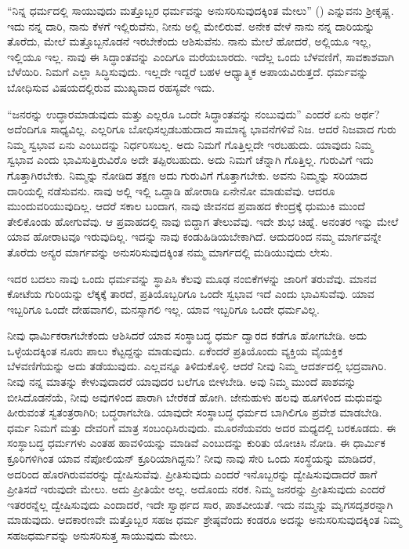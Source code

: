 “ನಿನ್ನ ಧರ್ಮದಲ್ಲಿ ಸಾಯುವುದು ಮತ್ತೊಬ್ಬರ ಧರ್ಮವನ್ನು ಅನುಸರಿಸುವುದಕ್ಕಿಂತ ಮೇಲು” () ಎನ್ನುವನು ಶ‍್ರೀಕೃಷ್ಣ. ಇದು ನನ್ನ ದಾರಿ, ನಾನು ಕೆಳಗೆ ಇಲ್ಲಿರುವೆನು, ನೀನು ಅಲ್ಲಿ ಮೇಲಿರುವೆ. ಅನೇಕ ವೇಳೆ ನಾನು ನನ್ನ ದಾರಿಯನ್ನು ತೊರೆದು, ಮೇಲೆ ಮತ್ತೊಬ್ಬನೊಡನೆ ಇರಬೇಕೆಂದು ಆಶಿಸುವೆನು. ನಾನು ಮೇಲೆ ಹೋದರೆ, ಅಲ್ಲಿಯೂ ಇಲ್ಲ, ಇಲ್ಲಿಯೂ ಇಲ್ಲ. ನಾವು ಈ ಸಿದ್ಧಾಂತವನ್ನು ಎಂದಿಗೂ ಮರೆಯಬಾರದು. ಇದೆಲ್ಲ ಒಂದು ಬೆಳವಣಿಗೆ, ಸಾವಕಾಶವಾಗಿ ಬೆಳೆಯಿರಿ. ನಿಮಗೆ ಎಲ್ಲಾ ಸಿದ್ಧಿಸುವುದು. ಇಲ್ಲದೇ ಇದ್ದರೆ ಬಹಳ ಆಧ್ಯಾತ್ಮಿಕ ಅಪಾಯವಿರುತ್ತದೆ. ಧರ್ಮವನ್ನು ಬೋಧಿಸುವ ವಿಷಯದಲ್ಲಿರುವ ಮುಖ್ಯವಾದ ರಹಸ್ಯವೇ ಇದು.

“ಜನರನ್ನು ಉದ್ಧಾರಮಾಡುವುದು ಮತ್ತು ಎಲ್ಲರೂ ಒಂದೇ ಸಿದ್ಧಾಂತವನ್ನು ನಂಬುವುದು” ಎಂದರೆ ಏನು ಅರ್ಥ? ಅದೆಂದಿಗೂ ಸಾಧ್ಯವಿಲ್ಲ. ಎಲ್ಲರಿಗೂ ಬೋಧಿಸಲ್ಪಡಬಹುದಾದ ಸಾಮಾನ್ಯ ಭಾವನೆಗಳಿವೆ ನಿಜ. ಆದರೆ ನಿಜವಾದ ಗುರು ನಿಮ್ಮ ಸ್ವಭಾವ ಏನು ಎಂಬುದನ್ನು ನಿರ್ಧರಿಸಬಲ್ಲ. ಅದು ನಿಮಗೆ ಗೊತ್ತಿಲ್ಲದೇ ಇರಬಹುದು. ಯಾವುದು ನಿಮ್ಮ ಸ್ವಭಾವ ಎಂದು ಭಾವಿಸುತ್ತಿರುವಿರೊ ಅದೇ ತಪ್ಪಿರಬಹುದು. ಅದು ನಿಮಗೆ ಚೆನ್ನಾಗಿ ಗೊತ್ತಿಲ್ಲ. ಗುರುವಿಗೆ ಇದು ಗೊತ್ತಾಗಿರಬೇಕು. ನಿಮ್ಮನ್ನು ನೋಡಿದ ತಕ್ಷಣ ಅದು ಗುರುವಿಗೆ ಗೊತ್ತಾಗಬೇಕು. ಅವನು ನಿಮ್ಮನ್ನು ಸರಿಯಾದ ದಾರಿಯಲ್ಲಿ ನಡೆಸುವನು. ನಾವು ಅಲ್ಲಿ ಇಲ್ಲಿ ಒದ್ದಾಡಿ ಹೋರಾಡಿ ಏನೇನೋ ಮಾಡುವೆವು. ಆದರೂ ಮುಂದುವರಿಯುವುದಿಲ್ಲ. ಆದರೆ ಸಕಾಲ ಬಂದಾಗ, ನಾವು ಜೀವನದ ಪ್ರವಾಹದ ಕೇಂದ್ರಕ್ಕೆ ಧುಮುಕಿ ಮುಂದೆ ತೇಲಿಕೊಂಡು ಹೋಗುವೆವು. ಆ ಪ್ರವಾಹದಲ್ಲಿ ನಾವು ಬಿದ್ದಾಗ ತೇಲುವೆವು. ಇದೇ ಶುಭ ಚಿಹ್ನೆ. ಅನಂತರ ಇನ್ನು ಮೇಲೆ ಯಾವ ಹೋರಾಟವೂ ಇರುವುದಿಲ್ಲ. ಇದನ್ನು ನಾವು ಕಂಡುಹಿಡಿಯಬೇಕಾಗಿದೆ. ಆದುದರಿಂದ ನಮ್ಮ ಮಾರ್ಗವನ್ನೇ ತೊರೆದು ಅನ್ಯರ ಮಾರ್ಗವನ್ನು ಅನುಸರಿಸುವುದಕ್ಕಿಂತ ನಮ್ಮ ಮಾರ್ಗದಲ್ಲಿ ಮಡಿಯುವುದು ಲೇಸು.

ಇದರ ಬದಲು ನಾವು ಒಂದು ಧರ್ಮವನ್ನು ಸ್ಥಾಪಿಸಿ ಕೆಲವು ಮೂಢ ನಂಬಿಕೆಗಳನ್ನು ಜಾರಿಗೆ ತರುವೆವು. ಮಾನವ ಕೋಟೆಯ ಗುರಿಯನ್ನು ಲೆಕ್ಕಕ್ಕೆ ತಾರದೆ, ಪ್ರತಿಯೊಬ್ಬರಿಗೂ ಒಂದೇ ಸ್ವಭಾವ ಇದೆ ಎಂದು ಭಾವಿಸುವೆವು. ಯಾವ ಇಬ್ಬರಿಗೂ ಒಂದೇ ದೇಹವಾಗಲಿ, ಮನಸ್ಸಾಗಲಿ ಇಲ್ಲ. ಯಾವ ಇಬ್ಬರಿಗೂ ಒಂದೇ ಧರ್ಮವಿಲ್ಲ.

ನೀವು ಧಾರ್ಮಿಕರಾಗಬೇಕೆಂದು ಆಶಿಸಿದರೆ ಯಾವ ಸಂಸ್ಥಾಬದ್ಧ ಧರ್ಮ ದ್ವಾರದ ಕಡೆಗೂ ಹೋಗಬೇಡಿ. ಅದು ಒಳ್ಳೆಯದಕ್ಕಿಂತ ನೂರು ಪಾಲು ಕೆಟ್ಟದ್ದನ್ನು ಮಾಡುವುದು. ಏಕೆಂದರೆ ಪ್ರತಿಯೊಂದು ವ್ಯಕ್ತಿಯ ವೈಯಕ್ತಿಕ ಬೆಳವಣಿಗೆಯನ್ನು ಅದು ತಡೆಯುವುದು. ಎಲ್ಲವನ್ನೂ ತಿಳಿದುಕೊಳ್ಳಿ. ಆದರೆ ನೀವು ನಿಮ್ಮ ಆದರ್ಶದಲ್ಲಿ ಭದ್ರವಾಗಿರಿ. ನೀವು ನನ್ನ ಮಾತನ್ನು ಕೇಳುವುದಾದರೆ ಯಾವುದರ ಬಲೆಗೂ ಬೀಳಬೇಡಿ. ಅವು ನಿಮ್ಮ ಮುಂದೆ ಪಾಶವನ್ನು ಬೀಸಿದೊಡನೆಯೆ, ನೀವು ಅವುಗಳಿಂದ ಪಾರಾಗಿ ಬೇರೆಕಡೆ ಹೋಗಿ. ಜೇನುಹುಳು ಹಲವು ಹೂಗಳಿಂದ ಮಧುವನ್ನು ಹೀರುವಂತೆ ಸ್ವತಂತ್ರರಾಗಿರಿ; ಬದ್ಧರಾಗಬೇಡಿ. ಯಾವುದೇ ಸಂಸ್ಥಾಬದ್ಧ ಧರ್ಮದ ಬಾಗಿಲಿಗೂ ಪ್ರವೇಶ ಮಾಡಬೇಡಿ. ಧರ್ಮ ನಿಮಗೆ ಮತ್ತು ದೇವರಿಗೆ ಮಾತ್ರ ಸಂಬಂಧಿಸಿರುವುದು. ಮೂರನೆಯವರು ಅದರ ಮಧ್ಯದಲ್ಲಿ ಬರಕೂಡದು. ಈ ಸಂಸ್ಥಾಬದ್ಧ ಧರ್ಮಗಳು ಎಂತಹ ಹಾವಳಿಯನ್ನು ಮಾಡಿವೆ ಎಂಬುದನ್ನು ಕುರಿತು ಯೋಚಿಸಿ ನೋಡಿ. ಈ ಧಾರ್ಮಿಕ ಕ್ರೂರಿಗಳಿಗಿಂತ ಯಾವ ನೆಪೋಲಿಯನ್ ​ಕ್ರೂರಿಯಾಗಿದ್ದನು? ನೀವು ನಾವು ಸೇರಿ ಒಂದು ಸಂಸ್ಥೆಯನ್ನು ಮಾಡಿದರೆ, ಅದರಿಂದ ಹೊರಗಿರುವವರನ್ನು ದ್ವೇಷಿಸುವೆವು. ಪ್ರೀತಿಸುವುದು ಎಂದರೆ ಇನೊಬ್ಬರನ್ನು ದ್ವೇಷಿಸುವುದಾದರೆ ಹಾಗೆ ಪ್ರೀತಿಸದೆ ಇರುವುದೇ ಮೇಲು. ಅದು ಪ್ರೀತಿಯೇ ಅಲ್ಲ. ಅದೊಂದು ನರಕ. ನಿಮ್ಮ ಜನರನ್ನು ಪ್ರೀತಿಸುವುದು ಎಂದರೆ ಇತರರನ್ನೆಲ್ಲ ದ್ವೇಷಿಸುವುದು ಎಂದಾದರೆ, ಇದೇ ಸ್ವಾರ್ಥದ ಸಾರ, ಪಾಶವೀಯತೆ. ಇದು ನಮ್ಮನ್ನು ಮೃಗಸದೃಶರನ್ನಾಗಿ ಮಾಡುವುದು. ಆದಕಾರಣವೇ ಮತ್ತೊಬ್ಬರ ಸಹಜ ಧರ್ಮ ಶ್ರೇಷ್ಠವೆಂದು ಕಂಡರೂ ಅದನ್ನು ಅನುಸರಿಸುವುದಕ್ಕಿಂತ ನಿಮ್ಮ ಸಹಜಧರ್ಮವನ್ನು ಅನುಸರಿಸುತ್ತ ಸಾಯುವುದು ಮೇಲು.

